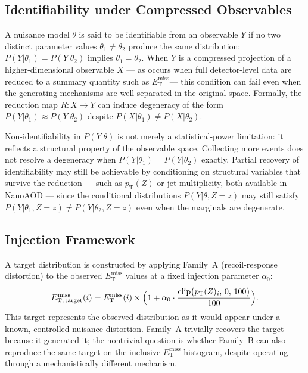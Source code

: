 \documentclass[a4paper,11pt]{article}
\newcommand{\MET}{\ensuremath{E_{\mathrm{T}}^{\mathrm{miss}}}\xspace}
\newcommand{\pTZ}{\ensuremath{p_{\mathrm{T}}(Z)}\xspace}
\begin{document}
\subsection{Identifiability under Compressed Observables}

A nuisance model $\theta$ is said to be identifiable from an observable $Y$
if no two distinct parameter values $\theta_1 \neq \theta_2$ produce the
same distribution: $P(Y|\theta_1) = P(Y|\theta_2)$ implies $\theta_1 =
\theta_2$.
When $Y$ is a compressed projection of a higher-dimensional observable $X$
--- as occurs when full detector-level data are reduced to a summary quantity
such as \MET --- this condition can fail even when the generating mechanisms
are well separated in the original space.
Formally, the reduction map $R: X \to Y$ can induce degeneracy of the form
$P(Y|\theta_1) \approx P(Y|\theta_2)$ despite
$P(X|\theta_1) \neq P(X|\theta_2)$.

Non-identifiability in $P(Y|\theta)$ is not merely a statistical-power
limitation: it reflects a structural property of the observable space.
Collecting more events does not resolve a degeneracy when
$P(Y|\theta_1) = P(Y|\theta_2)$ exactly.
Partial recovery of identifiability may still be achievable by conditioning
on structural variables that survive the reduction --- such as \pTZ or jet
multiplicity, both available in NanoAOD --- since the conditional
distributions $P(Y|\theta, Z{=}z)$ may still satisfy
$P(Y|\theta_1, Z{=}z) \neq P(Y|\theta_2, Z{=}z)$ even when the marginals
are degenerate.

\subsection{Injection Framework}

A target distribution is constructed by applying Family~A (recoil-response
distortion) to the observed \MET values at a fixed injection parameter
$\alpha_0$:
\begin{equation}
  E_{\mathrm{T},\,\mathrm{target}}^{\mathrm{miss}}(i) =
  E_{\mathrm{T}}^{\mathrm{miss}}(i) \times
  \Bigl(1 + \alpha_0 \cdot
    \frac{\mathrm{clip}\bigl(p_{\mathrm{T}}(Z)_i,\,0,\,100\bigr)}{100}
  \Bigr).
  \label{eq:injection}
\end{equation}
This target represents the observed distribution as it would appear under a
known, controlled nuisance distortion.
Family~A trivially recovers the target because it generated it; the
nontrivial question is whether Family~B can also reproduce the same target
on the inclusive \MET histogram, despite operating through a mechanistically
different mechanism.
\end{document}
